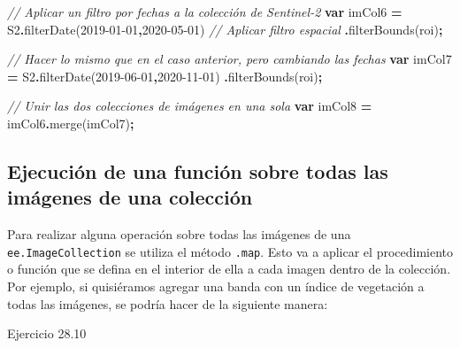 \documentclass[
  12pt,
  letterpaper,
  twoside]{book}
\newenvironment{Shaded}{\begin{snugshade}}{\end{snugshade}}
\newcommand{\CommentTok}[1]{\textcolor[rgb]{0.56,0.35,0.01}{\textit{#1}}}
\newcommand{\FunctionTok}[1]{\textcolor[rgb]{0.00,0.00,0.00}{#1}}
\newcommand{\KeywordTok}[1]{\textcolor[rgb]{0.13,0.29,0.53}{\textbf{#1}}}
\newcommand{\NormalTok}[1]{#1}
\newcommand{\OperatorTok}[1]{\textcolor[rgb]{0.81,0.36,0.00}{\textbf{#1}}}
\newcommand{\StringTok}[1]{\textcolor[rgb]{0.31,0.60,0.02}{#1}}
\begin{document}
\begin{Shaded}
\begin{Highlighting}[]
\CommentTok{// Aplicar un filtro por fechas a la colección de Sentinel{-}2}
\KeywordTok{var}\NormalTok{ imCol6 }\OperatorTok{=}\NormalTok{ S2}\OperatorTok{.}\FunctionTok{filterDate}\NormalTok{(}\StringTok{\textquotesingle{}2019{-}01{-}01\textquotesingle{}}\OperatorTok{,}\StringTok{\textquotesingle{}2020{-}05{-}01\textquotesingle{}}\NormalTok{)}
  \CommentTok{// Aplicar filtro espacial}
  \OperatorTok{.}\FunctionTok{filterBounds}\NormalTok{(roi)}\OperatorTok{;}

\CommentTok{// Hacer lo mismo que en el caso anterior, pero cambiando las fechas}
\KeywordTok{var}\NormalTok{ imCol7 }\OperatorTok{=}\NormalTok{ S2}\OperatorTok{.}\FunctionTok{filterDate}\NormalTok{(}\StringTok{\textquotesingle{}2019{-}06{-}01\textquotesingle{}}\OperatorTok{,}\StringTok{\textquotesingle{}2020{-}11{-}01\textquotesingle{}}\NormalTok{)}
  \OperatorTok{.}\FunctionTok{filterBounds}\NormalTok{(roi)}\OperatorTok{;}

\CommentTok{// Unir las dos colecciones de imágenes en una sola  }
\KeywordTok{var}\NormalTok{ imCol8 }\OperatorTok{=}\NormalTok{ imCol6}\OperatorTok{.}\FunctionTok{merge}\NormalTok{(imCol7)}\OperatorTok{;}
\end{Highlighting}
\end{Shaded}

\hypertarget{ejecuciuxf3n-de-una-funciuxf3n-sobre-todas-las-imuxe1genes-de-una-colecciuxf3n}{%
\subsection{Ejecución de una función sobre todas las imágenes de una colección}\label{ejecuciuxf3n-de-una-funciuxf3n-sobre-todas-las-imuxe1genes-de-una-colecciuxf3n}}

Para realizar alguna operación sobre todas las imágenes de una \texttt{ee.ImageCollection} se utiliza el método \texttt{.map}. Esto va a aplicar el procedimiento o función que se defina en el interior de ella a cada imagen dentro de la colección. Por ejemplo, si quisiéramos agregar una banda con un índice de vegetación a todas las imágenes, se podría hacer de la siguiente manera:

Ejercicio 28.10
\end{document}
